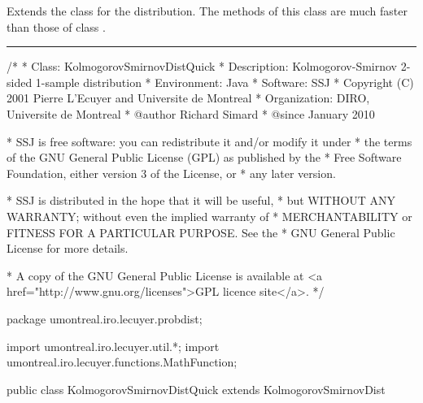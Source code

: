
Extends the class  for the \ks{} distribution.
The methods of this class %
are much faster than those of class
.

\begin{htmlonly}
\end{htmlonly}%
\begin{latexonly}%
\end{latexonly}%


\bigskip\hrule

\begin{code}\begin{hide}
/*
 * Class:        KolmogorovSmirnovDistQuick
 * Description:  Kolmogorov-Smirnov 2-sided 1-sample distribution
 * Environment:  Java
 * Software:     SSJ
 * Copyright (C) 2001  Pierre L'Ecuyer and Universite de Montreal
 * Organization: DIRO, Universite de Montreal
 * @author       Richard Simard
 * @since        January 2010

 * SSJ is free software: you can redistribute it and/or modify it under
 * the terms of the GNU General Public License (GPL) as published by the
 * Free Software Foundation, either version 3 of the License, or
 * any later version.

 * SSJ is distributed in the hope that it will be useful,
 * but WITHOUT ANY WARRANTY; without even the implied warranty of
 * MERCHANTABILITY or FITNESS FOR A PARTICULAR PURPOSE.  See the
 * GNU General Public License for more details.

 * A copy of the GNU General Public License is available at
   <a href="http://www.gnu.org/licenses">GPL licence site</a>.
 */
\end{hide}
package umontreal.iro.lecuyer.probdist;
\begin{hide}
import umontreal.iro.lecuyer.util.*;
import umontreal.iro.lecuyer.functions.MathFunction;
\end{hide}

public class KolmogorovSmirnovDistQuick extends KolmogorovSmirnovDist \begin{hide} {

   /*
      For n <= NEXACT, we use exact algorithms: the Durbin matrix and
      the Pomeranz algorithms. For n > NEXACT, we use asymptotic methods
      except for x close to 0 where we still use the method of Durbin
      for n <= NKOLMO. For n > NKOLMO, we use asymptotic methods only and
      so the precision is less for x close to 0.
      We could increase the limit NKOLMO to 10^6 to get better precision
      for x close to 0, but at the price of a slower speed.
   */
   private static final int NKOLMO = 100000;
\end{hide}
\end{code}
